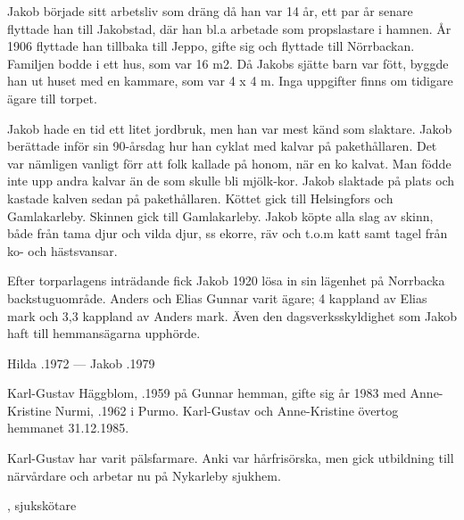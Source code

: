 Jakob började sitt arbetsliv som dräng då han var 14 år, ett par år senare flyttade han till Jakobstad, där han bl.a arbetade som propslastare i hamnen. År 1906 flyttade han tillbaka till Jeppo, gifte sig och flyttade till Nörrbackan. Familjen bodde i ett hus, som var 16 m2. Då Jakobs sjätte barn var fött, byggde han ut huset med en kammare, som var 4 x 4 m. Inga uppgifter finns om tidigare ägare till torpet.

Jakob hade en tid ett litet jordbruk, men han var mest känd som slaktare. Jakob berättade inför sin 90-årsdag hur han cyklat med kalvar på pakethållaren. Det var nämligen vanligt förr att folk kallade på honom, när en ko kalvat. Man födde inte upp andra kalvar än de som skulle bli mjölk-kor. Jakob slaktade på plats och kastade kalven sedan på pakethållaren. Köttet gick till Helsingfors och Gamlakarleby. Skinnen gick till Gamlakarleby. Jakob köpte alla slag av skinn, både från tama djur och vilda djur, ss ekorre, räv och t.o.m katt samt tagel från ko- och hästsvansar.

Efter torparlagens inträdande fick Jakob 1920 lösa in sin lägenhet på Norrbacka backstuguområde. Anders och Elias Gunnar varit ägare; 4 kappland av Elias mark och 3,3 kappland av Anders mark. Även den dagsverksskyldighet som Jakob haft till hemmansägarna upphörde.

Hilda .1972  ---  Jakob .1979






Karl-Gustav Häggblom, .1959 på Gunnar hemman, gifte sig år 1983 med Anne-Kristine Nurmi, .1962 i Purmo. Karl-Gustav och Anne-Kristine övertog hemmanet 31.12.1985.

Karl-Gustav har varit pälsfarmare. Anki var hårfrisörska, men gick utbildning till närvårdare och arbetar nu på Nykarleby sjukhem.
\begin{jhchildren}
  \item {}
  \item {}, sjukskötare
\end{jhchildren}


